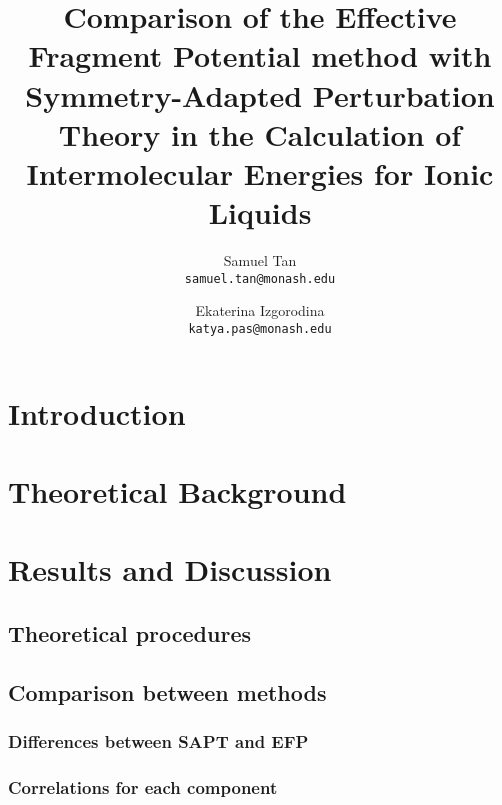 \documentclass[final]{article}
\title{Comparison of the Effective Fragment Potential method with Symmetry-Adapted Perturbation Theory in the Calculation of Intermolecular Energies for Ionic Liquids}
\date{}
\author{Samuel Tan\\
        \texttt{samuel.tan@monash.edu} 
        \and
        Ekaterina Izgorodina\\
        \texttt{katya.pas@monash.edu}
}
\begin{document}
%
\clearpage

\maketitle
\begin{multicols}{2}

\section{Introduction}


\section{Theoretical Background}


\section{Results and Discussion}


\subsection{Theoretical procedures}


\subsection{Comparison between methods}
\subsubsection{Differences between SAPT and EFP}


\subsubsection{Correlations for each component}



\end{multicols}
\end{document}
